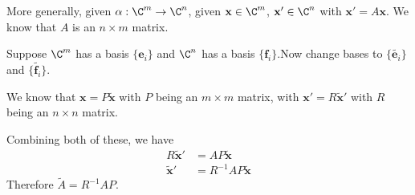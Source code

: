 \documentclass[a4paper]{article}
\begin{document}
  More generally, given $\alpha: \C^m \to \C^n$, given $\mathbf{x}\in \C^m$, $\mathbf{x}'\in \C^n$ with $\mathbf{x}' = A\mathbf{x}$. We know that $A$ is an $n\times m$ matrix.

  Suppose $\C^m$ has a basis $\{\mathbf{e}_i\}$ and $\C^n$ has a basis $\{\mathbf{f}_i\}$.Now change bases to $\{\tilde{\mathbf{e}_i}\}$ and $\{\tilde{\mathbf{f}_i}\}$.

  We know that $\mathbf{x} = P\mathbf{\tilde{x}}$ with $P$ being an $m\times m$ matrix, with $\mathbf{x}' = R\tilde{\mathbf{x}}'$ with $R$ being an $n\times n$ matrix.

  Combining both of these, we have
  \begin{align*}
    R\tilde{\mathbf{x}}' &= AP\tilde{\mathbf{x}}\\
    \tilde{\mathbf{x}}' &= R^{-1}AP\mathbf{\tilde{x}}
  \end{align*}
  Therefore $\tilde{A} = R^{-1}AP$.
\end{document}
